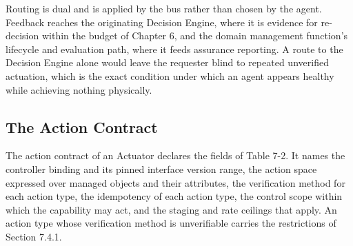 Routing is dual and is applied by the bus rather than chosen by the
agent. Feedback reaches the originating Decision Engine, where it is
evidence for re-decision within the budget of Chapter 6, and the domain
management function's lifecycle and evaluation path, where it feeds
assurance reporting. A route to the Decision Engine alone would leave
the requester blind to repeated unverified actuation, which is the exact
condition under which an agent appears healthy while achieving nothing
physically.

\hypertarget{the-action-contract}{%
\subsection{The Action Contract}\label{the-action-contract}}

The action contract of an Actuator declares the fields of Table 7-2. It
names the controller binding and its pinned interface version range, the
action space expressed over managed objects and their attributes, the
verification method for each action type, the idempotency of each action
type, the control scope within which the capability may act, and the
staging and rate ceilings that apply. An action type whose verification
method is unverifiable carries the restrictions of Section 7.4.1.

